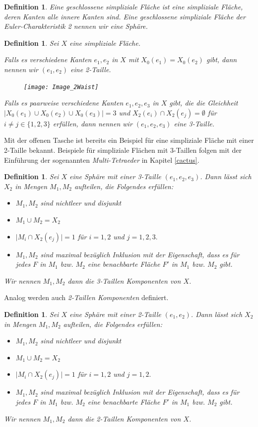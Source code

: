 \documentclass[12pt,titlepage,twoside,cleardoublepage]{article}
\theoremstyle{nummermitklammern}
\newtheorem{definition}[temp]{Definition}
\newtheorem{definition}[zahl]{Definition}
\numberwithin{equation}{section}
\begin{document}
\begin{definition}  Eine \emph{geschlossene} simpliziale Fläche ist eine simpliziale Fläche, deren Kanten alle innere Kanten sind. Eine geschlossene simpliziale Fläche der Euler-Charakteristik  2 nennen wir eine \emph{Sphäre}.
\end{definition} 

\begin{definition}
Sei $X$ eine simpliziale Fläche.

 Falls es verschiedene Kanten $e_1,e_2$ in $X$ mit $X_0(e_1)=X_0(e_2)$ gibt, dann nennen wir $(e_1,e_2)$ eine 2-Taille.
 \begin{figure}[H]
\begin{center}
\texttt{[image: Image\_2Waist]}
\end{center}
\end{figure} 
 Falls es paarweise verschiedene Kanten $e_1,e_2,e_3$ in $X$ gibt, die die Gleichheit $\vert X_0(e_1)\cup X_0(e_2)\cup X_0(e_3) \vert=3$ und $X_2(e_i)\cap X_2(e_j)=\emptyset$ für $i \neq j\in\{1,2,3\}  $ erfüllen, dann nennen wir $(e_1,e_2,e_3)$ eine 3-Taille. 
\end{definition}
Mit der offenen Tasche ist bereits ein Beispiel für eine simpliziale Fläche mit einer 2-Taille bekannt. Beispiele für simpliziale Flächen mit 3-Taillen folgen mit der Einführung der sogenannten \emph{Multi-Tetraeder} in Kapitel \ref{cactus}. 
\begin{definition} \label{2waistk}
Sei $X$ eine Sphäre mit einer 3-Taille $(e_1,e_2,e_3)$. Dann lässt sich $X_2$ in  Mengen $M_1,M_2$ aufteilen, die Folgendes erfüllen:
\begin{itemize}
\item $M_1,M_2$ sind nichtleer und disjunkt
\item $M_1\cup M_2=X_2$
\item $\vert M_i \cap X_2(e_j)\vert =1$ für $i=1,2$ und $j=1,2,3.$
\item $M_1,M_2$ sind maximal bezüglich Inklusion mit der Eigenschaft, dass es für jedes $F$ in $M_1$ bzw. $M_2$ eine benachbarte Fläche $F'$ in $M_1$ bzw. $M_2$ gibt.
\end{itemize}  
Wir nennen $M_1,M_2$ dann die \emph{3-Taillen Komponenten} von $X$. 
\end{definition}
Analog werden auch \emph{2-Taillen Komponenten} definiert.
\begin{definition}
Sei $X$ eine Sphäre mit einer 2-Taille $(e_1,e_2)$. Dann lässt sich $X_2$ in  Mengen $M_1,M_2$ aufteilen, die Folgendes erfüllen:
\begin{itemize}
\item $M_1,M_2$ sind nichtleer und disjunkt
\item $M_1\cup M_2=X_2$
\item $\vert M_i \cap X_2(e_j)\vert =1$ für $i=1,2$ und $j=1,2.$
\item $M_1,M_2$ sind maximal bezüglich Inklusion mit der Eigenschaft, dass es für jedes $F$ in $M_1$ bzw. $M_2$ eine benachbarte Fläche $F'$ in $M_1$ bzw. $M_2$ gibt.
\end{itemize}  
 Wir nennen $M_1,M_2$ dann die \emph{2-Taillen Komponenten} von $X$. 
\end{definition}
\end{document}
